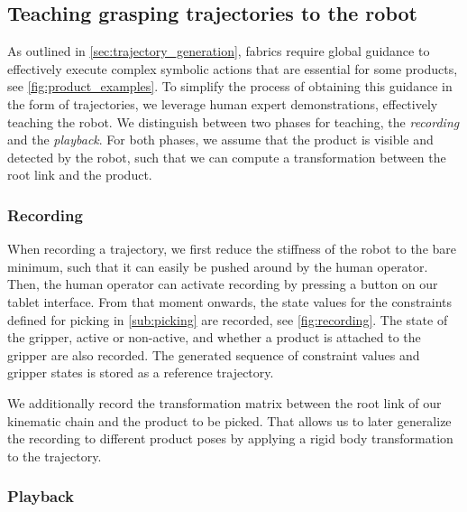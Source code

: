 \subsection{Teaching grasping trajectories to the robot}
\label{sub:teaching}

As outlined in \cref{sec:trajectory_generation},
\ac{fabrics} require global guidance to effectively execute
complex symbolic actions that are essential for some products, see
\cref{fig:product_examples}.
To simplify the process of obtaining this guidance in the form of trajectories, we leverage human expert demonstrations, effectively teaching the robot.
We distinguish between two
phases for teaching, the \textit{recording} and the
\textit{playback}. For both phases, we assume that the product
is visible and detected by the robot, such that we can
compute a transformation between the root link and the product.

\subsubsection{Recording}
When recording a trajectory, we first reduce the stiffness
of the robot to the bare minimum, such that it can easily be
pushed around by the human operator. Then, the human
operator can activate recording by pressing a button on our tablet interface. From that moment onwards, the state values \x{} for the
constraints defined for picking in \cref{sub:picking}
are recorded, see \cref{fig:recording}.
The state of the gripper, active
or non-active, and whether a product is attached to the gripper
are also recorded.
The generated sequence of constraint values and gripper
states is stored as a reference trajectory.

We additionally record the
transformation matrix between the root link of our kinematic
chain and the product to be picked. That allows us to later
generalize the recording to different product poses by applying a rigid body transformation to the trajectory.


\subsubsection{Playback}

